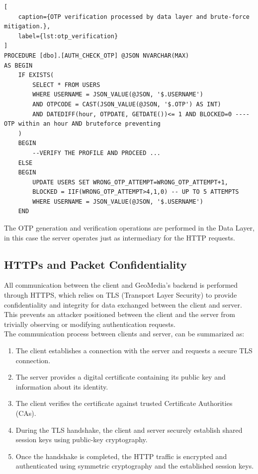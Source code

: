 \begin{lstlisting}[
    caption={OTP verification processed by data layer and brute-force mitigation.},
    label={lst:otp_verification}
]
PROCEDURE [dbo].[AUTH_CHECK_OTP] @JSON NVARCHAR(MAX)
AS BEGIN
    IF EXISTS(
        SELECT * FROM USERS 
        WHERE USERNAME = JSON_VALUE(@JSON, '$.USERNAME')
        AND OTPCODE = CAST(JSON_VALUE(@JSON, '$.OTP') AS INT)
        AND DATEDIFF(hour, OTPDATE, GETDATE())<= 1 AND BLOCKED=0 ----OTP within an hour AND bruteforce preventing
    )
    BEGIN
        --VERIFY THE PROFILE AND PROCEED ...
    ELSE
    BEGIN
        UPDATE USERS SET WRONG_OTP_ATTEMPT=WRONG_OTP_ATTEMPT+1,
        BLOCKED = IIF(WRONG_OTP_ATTEMPT>4,1,0) -- UP TO 5 ATTEMPTS
        WHERE USERNAME = JSON_VALUE(@JSON, '$.USERNAME')
    END
\end{lstlisting}

The OTP generation and verification operations are performed in the Data Layer, in this case the server operates just as intermediary for the HTTP requests.


\subsection{HTTPs and Packet Confidentiality}
\label{sub:http_sec}
All communication between the client and GeoMedia's backend is performed through HTTPS, which relies on TLS (Transport Layer Security) to provide confidentiality and integrity for data exchanged between the client and server. This prevents an attacker positioned between the client and the server from trivially observing or modifying authentication requests.\\

The communication process between clients and server, can be summarized as:
\begin{enumerate}
    \item The client establishes a connection with the server and requests a secure TLS connection.
    \item The server provides a digital certificate containing its public key and information about its identity.
    \item The client verifies the certificate against trusted Certificate Authorities (CAs).
    \item During the TLS handshake, the client and server securely establish shared session keys using public-key cryptography.
    \item Once the handshake is completed, the HTTP traffic is encrypted and authenticated using symmetric cryptography and the established session keys.
\end{enumerate}

